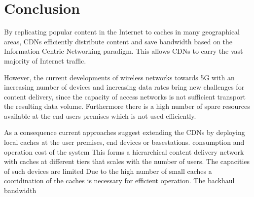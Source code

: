 \chapter{Conclusion}\label{chap:conclusion}

By replicating popular content in the Internet to caches in many geographical areas, CDNs efficiently distribute content and save bandwidth based on the Information Centric Networking paradigm.
This allows CDNs to carry the vast majority of Internet traffic.

However, the current developments of wireless networks towards 5G with an increasing number of devices and increasing data rates bring new challenges for content delivery, since the capacity of access networks is not sufficient transport the resulting data volume.
Furthermore there is a high number of spare resources available at the end users premises which is not used efficiently.

As a consequence current approaches suggest extending the CDNs by deploying local caches at the user premises, end devices or basestations.
consumption and operation cost of the system
This forms a hierarchical content delivery network with caches at different tiers that scales with the number of users.
The capacities of such devices are limited
Due to the high number of small caches a cooridination of the caches is necessary for efficient operation.
The backhaul bandwidth

